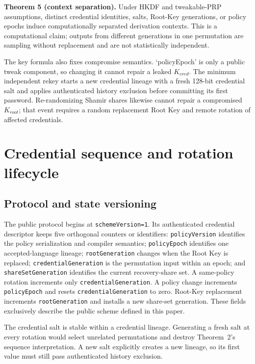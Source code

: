 \documentclass[preprint,12pt]{elsarticle}
\begin{document}
\textbf{Theorem 5 (context separation).} Under HKDF and tweakable-PRP
assumptions, distinct credential identities, salts, Root-Key generations, or
policy epochs induce computationally separated derivation contexts. This is a
computational claim; outputs from different generations in one permutation are
sampling without replacement and are not statistically independent.

The key formula also fixes compromise semantics. `policyEpoch' is only a public
tweak component, so changing it cannot repair a leaked $K_{cred}$. The minimum
independent rekey starts a new credential lineage with a fresh 128-bit
credential salt and applies authenticated history exclusion before committing
its first password. Re-randomizing Shamir shares likewise cannot repair a
compromised $K_{root}$; that event requires a random replacement Root Key and
remote rotation of affected credentials.

\section{Credential sequence and rotation lifecycle}

\subsection{Protocol and state versioning}

The public protocol begins at \texttt{schemeVersion=1}. Its authenticated
credential descriptor keeps five orthogonal counters or identifiers:
\texttt{policyVersion} identifies the policy serialization and compiler
semantics; \texttt{policyEpoch} identifies one accepted-language lineage;
\texttt{rootGeneration} changes when the Root Key is replaced;
\texttt{credentialGeneration} is the permutation input within an epoch; and
\texttt{shareSetGeneration} identifies the current recovery-share set. A
same-policy rotation increments only \texttt{credentialGeneration}. A policy
change increments \texttt{policyEpoch} and resets
\texttt{credentialGeneration} to zero. Root-Key replacement increments
\texttt{rootGeneration} and installs a new share-set generation. These fields
exclusively describe the public scheme defined in this paper.

The credential salt is stable within a credential lineage. Generating a fresh
salt at every rotation would select unrelated permutations and destroy
Theorem~2's sequence interpretation. A new salt explicitly creates a new
lineage, so its first value must still pass authenticated history exclusion.
\end{document}
